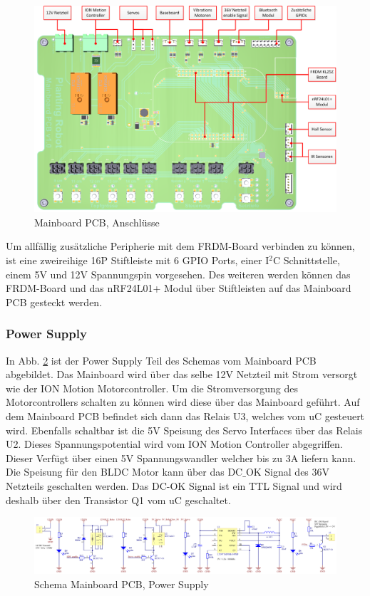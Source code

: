 \begin{figure}[H]
	\includegraphics[width=1\textwidth]{Illustrationen/6-Umsetzung/Mainboard_PCB_Anschluesse.png}
	\caption{Mainboard PCB, Anschlüsse}
	\label{fig:Mainboard_3D}
\end{figure}

Um allfällig zusätzliche Peripherie mit dem FRDM-Board verbinden zu können, ist eine zweireihige 16P Stiftleiste mit 6 GPIO Ports, einer I$^{2}$C Schnittstelle, einem 5V und 12V Spannungspin vorgesehen. Des weiteren werden können das FRDM-Board und das nRF24L01+ Modul über Stiftleisten auf das Mainboard PCB gesteckt werden.

\subsubsection{Power Supply}
In Abb. \ref{fig:Schema_Mainboard_PowerSupply} ist der Power Supply Teil des Schemas vom Mainboard PCB abgebildet. Das Mainboard wird über das selbe 12V Netzteil mit Strom versorgt wie der ION Motion Motorcontroller. Um die Stromversorgung des Motorcontrollers schalten zu können wird diese über das Mainboard geführt. Auf dem Mainboard PCB befindet sich dann das Relais U3, welches vom uC gesteuert wird. Ebenfalls schaltbar ist die 5V Speisung des Servo Interfaces über das Relais U2. Dieses Spannungspotential wird vom ION Motion Controller abgegriffen. Dieser Verfügt über einen 5V Spannungswandler welcher bis zu 3A liefern kann. Die Speisung für den BLDC Motor kann über das DC$\_$OK Signal des 36V Netzteils geschalten werden. Das DC-OK Signal ist ein TTL Signal und wird deshalb über den Transistor Q1 vom uC geschaltet.

\begin{figure}[H]
	\includegraphics[width=1\textwidth]{Illustrationen/6-Umsetzung/Schema_Mainboard_PowerSupply.png}
	\caption{Schema Mainboard PCB, Power Supply}
	\label{fig:Schema_Mainboard_PowerSupply}
\end{figure}

